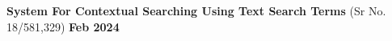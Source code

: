 \begin{zitemize}
    \item \textbf{System For Contextual Searching Using Text Search Terms} (Sr No. 18/581,329)  \hfill \textbf{Feb 2024}
    \vspace{1mm}
    \end{zitemize}